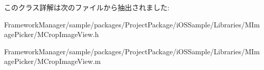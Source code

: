 このクラス詳解は次のファイルから抽出されました\+:\begin{DoxyCompactItemize}
\item 
Framework\+Manager/sample/packages/\+Project\+Package/i\+O\+S\+Sample/\+Libraries/\+M\+Image\+Picker/M\+Crop\+Image\+View.\+h\item 
Framework\+Manager/sample/packages/\+Project\+Package/i\+O\+S\+Sample/\+Libraries/\+M\+Image\+Picker/M\+Crop\+Image\+View.\+m\end{DoxyCompactItemize}
